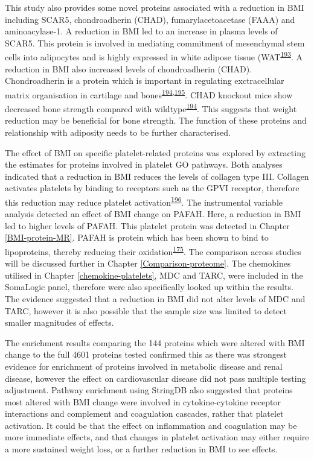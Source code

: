 \documentclass[11pt,twoside]{bristolthesis}
\begin{document}
This study also provides some novel proteins associated with a reduction in BMI including SCAR5, chondroadherin (CHAD), fumarylacetoacetase (FAAA) and aminoacylase-1. A reduction in BMI led to an increase in plasma levels of SCAR5. This protein is involved in mediating commitment of mesenchymal stem cells into adipocytes and is highly expressed in white adipose tissue (WAT\textsuperscript{\protect\hyperlink{ref-Lee2017a}{193}}. A reduction in BMI also increased levels of chondroadherin (CHAD). Chondroadherin is a protein which is important in regulating exctracellular matrix organisation in cartilage and bones\textsuperscript{\protect\hyperlink{ref-Hessle2013}{194},\protect\hyperlink{ref-Iozzo2015}{195}}. CHAD knockout mice show decreased bone strength compared with wildtype\textsuperscript{\protect\hyperlink{ref-Hessle2013}{194}}. This suggests that weight reduction may be beneficial for bone strength. The function of these proteins and relationship with adiposity needs to be further characterised.

The effect of BMI on specific platelet-related proteins was explored by extracting the estimates for proteins involved in platelet GO pathways. Both analyses indicated that a reduction in BMI reduces the levels of collagen type III. Collagen activates platelets by binding to receptors such as the GPVI receptor, therefore this reduction may reduce platelet activation\textsuperscript{\protect\hyperlink{ref-Maurice2006}{196}}. The instrumental variable analysis detected an effect of BMI change on PAFAH. Here, a reduction in BMI led to higher levels of PAFAH. This platelet protein was detected in Chapter \ref{BMI-protein-MR}. PAFAH is protein which has been shown to bind to lipoproteins, thereby reducing their oxidation\textsuperscript{\protect\hyperlink{ref-Noto2003}{175}}. The comparison across studies will be discussed further in Chapter \ref{Comparison-proteome}. The chemokines utilised in Chapter \ref{chemokine-platelets}, MDC and TARC, were included in the SomaLogic panel, therefore were also specifically looked up within the results. The evidence suggested that a reduction in BMI did not alter levels of MDC and TARC, however it is also possible that the sample size was limited to detect smaller magnitudes of effects.

The enrichment results comparing the 144 proteins which were altered with BMI change to the full 4601 proteins tested confirmed this as there was strongest evidence for enrichment of proteins involved in metabolic disease and renal disease, however the effect on cardiovascular disease did not pass multiple testing adjustment. Pathway enrichment using StringDB also suggested that proteins most altered with BMI change were involved in cytokine-cytokine receptor interactions and complement and coagulation cascades, rather that platelet activation. It could be that the effect on inflammation and coagulation may be more immediate effects, and that changes in platelet activation may either require a more sustained weight loss, or a further reduction in BMI to see effects.
\end{document}
